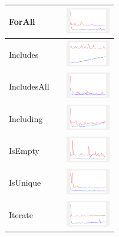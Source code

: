 \begin{longtable}{ m{2.5cm} m{8cm} m{2cm} }
ForAll &

&
\includegraphics[width=2cm]{graphs/bag/small/forALL}
\\\hline

Includes &

&
\includegraphics[width=2cm]{graphs/bag/small/Includes}
\\\hline

IncludesAll &

&
\includegraphics[width=2cm]{graphs/bag/small/IncludesAll}
\\\hline

Including &

&
\includegraphics[width=2cm]{graphs/bag/small/Including}
\\\hline

IsEmpty &

&
\includegraphics[width=2cm]{graphs/bag/small/IsEmpty}
\\\hline

IsUnique &

&
\includegraphics[width=2cm]{graphs/bag/small/isUnique}
\\\hline

Iterate &

&
\includegraphics[width=2cm]{graphs/bag/small/Iterate}
\\\hline


\end{longtable}
